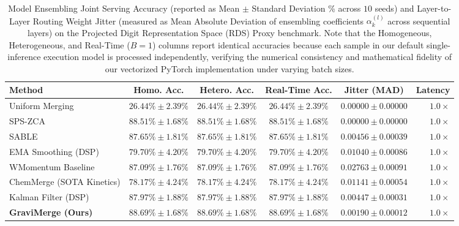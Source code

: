 \begin{table}[t]
\vspace{-5pt}
\caption{Model Ensembling Joint Serving Accuracy (reported as Mean $\pm$ Standard Deviation \% across $10$ seeds) and Layer-to-Layer Routing Weight Jitter (measured as Mean Absolute Deviation of ensembling coefficients $\alpha_k^{(l)}$ across sequential layers) on the Projected Digit Representation Space (RDS) Proxy benchmark. Note that the Homogeneous, Heterogeneous, and Real-Time ($B=1$) columns report identical accuracies because each sample in our default single-inference execution model is processed independently, verifying the numerical consistency and mathematical fidelity of our vectorized PyTorch implementation under varying batch sizes.}
\label{tab:main_results}
\vskip 0.05in
\begin{center}
\begin{small}
\begin{sc}
\setlength{\tabcolsep}{3.5pt}
\begin{tabular}{lccccr}
\toprule
Method & Homo. Acc. & Hetero. Acc. & Real-Time Acc. & Jitter (MAD) & Latency \\
\midrule
Uniform Merging   & $26.44\% \pm 2.39\%$ & $26.44\% \pm 2.39\%$ & $26.44\% \pm 2.39\%$ & $0.00000 \pm 0.00000$ & $1.0\times$ \\
SPS-ZCA \cite{zhang24spszca} & $88.51\% \pm 1.68\%$  & $88.51\% \pm 1.68\%$  & $88.51\% \pm 1.68\%$  & $0.00000 \pm 0.00000$ & $1.0\times$ \\
SABLE \cite{liang23sable}  & $87.65\% \pm 1.81\%$  & $87.65\% \pm 1.81\%$  & $87.65\% \pm 1.81\%$  & $0.00456 \pm 0.00039$ & $1.0\times$ \\
EMA Smoothing (DSP) & $79.70\% \pm 4.20\%$  & $79.70\% \pm 4.20\%$  & $79.70\% \pm 4.20\%$  & $0.01040 \pm 0.00086$ & $1.0\times$ \\
WMomentum Baseline & $87.09\% \pm 1.76\%$  & $87.09\% \pm 1.76\%$  & $87.09\% \pm 1.76\%$  & $0.02763 \pm 0.00091$ & $1.0\times$ \\
ChemMerge (SOTA Kinetics) & $78.17\% \pm 4.24\%$  & $78.17\% \pm 4.24\%$  & $78.17\% \pm 4.24\%$  & $0.01141 \pm 0.00054$ & $1.0\times$ \\
Kalman Filter (DSP) & $87.97\% \pm 1.88\%$ & $87.97\% \pm 1.88\%$ & $87.97\% \pm 1.88\%$ & $0.00447 \pm 0.00031$ & $1.0\times$ \\
\textbf{GraviMerge (Ours)} & $\mathbf{88.69\% \pm 1.68\%}$  & $\mathbf{88.69\% \pm 1.68\%}$  & $\mathbf{88.69\% \pm 1.68\%}$  & $\mathbf{0.00190 \pm 0.00012}$ & $1.0\times$ \\
\bottomrule
\end{tabular}
\end{sc}
\end{small}
\end{center}
\vskip -0.1in
\vspace{-10pt}
\end{table}

